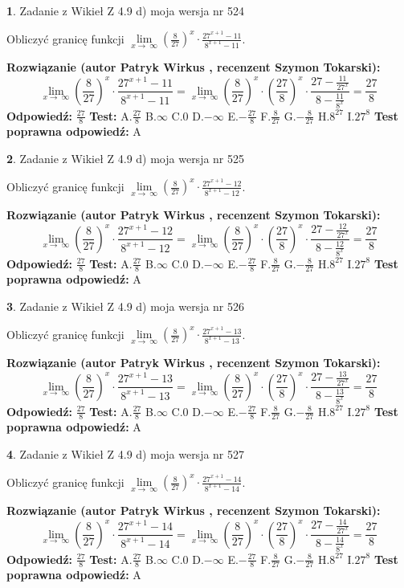 \documentclass[12pt, a4paper]{article}
\theoremstyle{definition} %
\newtheorem{zad}{}
\newcommand{\zadStart}[1]{\begin{zad}#1\newline}
\newcommand{\zadStop}{\end{zad}}
\newcommand{\rozwStart}[2]{\noindent \textbf{Rozwiązanie (autor #1 , recenzent #2): }\newline}
\newcommand{\rozwStop}{\newline}
\newcommand{\odpStart}{\noindent \textbf{Odpowiedź:}\newline}
\newcommand{\odpStop}{\newline}
\newcommand{\testStart}{\noindent \textbf{Test:}\newline}
\newcommand{\testStop}{\newline}
\newcommand{\kluczStart}{\noindent \textbf{Test poprawna odpowiedź:}\newline}
\newcommand{\kluczStop}{\newline}
\begin{document}
\zadStart{Zadanie z Wikieł Z 4.9 d) moja wersja nr 524}


Obliczyć granicę funkcji  $\lim\limits_{x\to\ \infty}(\frac{8}{27})^{x}\cdot\frac{27^{x+1}-11}{8^{x+1}-11}$.
\zadStop
\rozwStart{Patryk Wirkus}{Szymon Tokarski}
$$\lim\limits_{x\to\ \infty}(\frac{8}{27})^{x}\cdot\frac{27^{x+1}-11}{8^{x+1}-11}=\lim\limits_{x\to\ \infty}(\frac{8}{27})^{x}\cdot(\frac{27}{8})^{x} \cdot \frac{27-\frac{11}{27^{x}}}{8-\frac{11}{8^{x}}} = \frac{27}{8}$$
\rozwStop
\odpStart
$\frac{27}{8}$
\odpStop
\testStart
A.$\frac{27}{8}$ B.$\infty$ C.$0$ D.$-\infty$ E.$-\frac{27}{8}$
F.$\frac{8}{27}$ G.$-\frac{8}{27}$
H.$8^{27}$
I.$27^{8}$
\testStop
\kluczStart
A
\kluczStop



\zadStart{Zadanie z Wikieł Z 4.9 d) moja wersja nr 525}


Obliczyć granicę funkcji  $\lim\limits_{x\to\ \infty}(\frac{8}{27})^{x}\cdot\frac{27^{x+1}-12}{8^{x+1}-12}$.
\zadStop
\rozwStart{Patryk Wirkus}{Szymon Tokarski}
$$\lim\limits_{x\to\ \infty}(\frac{8}{27})^{x}\cdot\frac{27^{x+1}-12}{8^{x+1}-12}=\lim\limits_{x\to\ \infty}(\frac{8}{27})^{x}\cdot(\frac{27}{8})^{x} \cdot \frac{27-\frac{12}{27^{x}}}{8-\frac{12}{8^{x}}} = \frac{27}{8}$$
\rozwStop
\odpStart
$\frac{27}{8}$
\odpStop
\testStart
A.$\frac{27}{8}$ B.$\infty$ C.$0$ D.$-\infty$ E.$-\frac{27}{8}$
F.$\frac{8}{27}$ G.$-\frac{8}{27}$
H.$8^{27}$
I.$27^{8}$
\testStop
\kluczStart
A
\kluczStop



\zadStart{Zadanie z Wikieł Z 4.9 d) moja wersja nr 526}


Obliczyć granicę funkcji  $\lim\limits_{x\to\ \infty}(\frac{8}{27})^{x}\cdot\frac{27^{x+1}-13}{8^{x+1}-13}$.
\zadStop
\rozwStart{Patryk Wirkus}{Szymon Tokarski}
$$\lim\limits_{x\to\ \infty}(\frac{8}{27})^{x}\cdot\frac{27^{x+1}-13}{8^{x+1}-13}=\lim\limits_{x\to\ \infty}(\frac{8}{27})^{x}\cdot(\frac{27}{8})^{x} \cdot \frac{27-\frac{13}{27^{x}}}{8-\frac{13}{8^{x}}} = \frac{27}{8}$$
\rozwStop
\odpStart
$\frac{27}{8}$
\odpStop
\testStart
A.$\frac{27}{8}$ B.$\infty$ C.$0$ D.$-\infty$ E.$-\frac{27}{8}$
F.$\frac{8}{27}$ G.$-\frac{8}{27}$
H.$8^{27}$
I.$27^{8}$
\testStop
\kluczStart
A
\kluczStop



\zadStart{Zadanie z Wikieł Z 4.9 d) moja wersja nr 527}


Obliczyć granicę funkcji  $\lim\limits_{x\to\ \infty}(\frac{8}{27})^{x}\cdot\frac{27^{x+1}-14}{8^{x+1}-14}$.
\zadStop
\rozwStart{Patryk Wirkus}{Szymon Tokarski}
$$\lim\limits_{x\to\ \infty}(\frac{8}{27})^{x}\cdot\frac{27^{x+1}-14}{8^{x+1}-14}=\lim\limits_{x\to\ \infty}(\frac{8}{27})^{x}\cdot(\frac{27}{8})^{x} \cdot \frac{27-\frac{14}{27^{x}}}{8-\frac{14}{8^{x}}} = \frac{27}{8}$$
\rozwStop
\odpStart
$\frac{27}{8}$
\odpStop
\testStart
A.$\frac{27}{8}$ B.$\infty$ C.$0$ D.$-\infty$ E.$-\frac{27}{8}$
F.$\frac{8}{27}$ G.$-\frac{8}{27}$
H.$8^{27}$
I.$27^{8}$
\testStop
\kluczStart
A
\kluczStop
\end{document}

